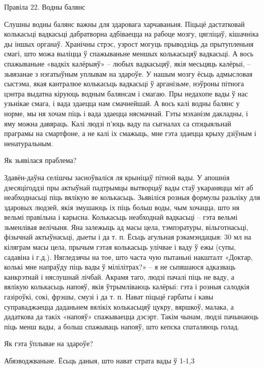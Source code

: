 Правіла 22. Водны балянс

Слушны водны балянс важны для здаровага харчаваньня. Піцьцё дастатковай колькасьці вадкасьці дабратворна адбіваецца на рабоце мозгу, цягліцаў, кішачніка ды іншых органаў. Хранічны стрэс, узрост могуць прыводзіць да прытупленьня смагі, што можа выліцца ў спажываньне меншых колькасьцяў вадкасьці. А вось спажываньне «вадкіх калёрыяў» – любых вадкасьцяў, якія месьцяць калёрыі, – зьвязанае з нэгатыўным уплывам на здароўе.
У нашым мозгу ёсьць адмысловая сыстэма, якая кантралюе колькасьць вадкасьці ў арганізьме, нэўроны пітнога цэнтра выдатна кіруюць водным балянсам і смагаю. Пры недахопе вады ў нас узьнікае смага, і вада здаецца нам смачнейшай. А вось калі водны балянс у норме, мы ня хочам піць і вада здаецца нясмачнай. Гэты мэханізм дакладны, і яму можна давяраць. Калі людзі п'юць ваду па сыгналах са спэцыяльнай праграмы на смартфоне, а не калі іх смажыць, мне гэта здаецца крыху дзіўным і ненатуральным.

Як зьявілася праблема?

Здавён-даўна селішчы засноўваліся ля крыніцаў пітной вады. У апошнія дзесяцігоддзі пры актыўнай падтрымцы вытворцаў вады стаў укараняцца міт аб неабходнасьці піць вялікую яе колькасьць. Зьявіліся розныя формулы разьліку для здаровых людзей, якія змушаюць іх піць больш воды, чым хочацца, што ня вельмі правільна і карысна. Колькасьць неабходнай вадкасьці – гэта вельмі зьменлівая велічыня. Яна залежыць ад масы цела, тэмпэратуры, вільготнасьці, фізычнай актыўнасьці, дыеты і да т. п. Ёсьць агульная рэкамэндацыя: 30 мл на кіляграм масы цела, прычым гэтая колькасьць улічвае і ваду ў ежы (супы, садавіна і г.д.). Нягледзячы на тое, што часта чую пытаньні накшталт «Доктар, колькі мне напраўду піць вады ў мілілітрах?» – я не сьпяшаюся адказваць канкрэтнай і няслушнай лічбай.
Акрамя таго, людзі пачалі піць не ваду, а вялікую колькасьць напояў, якія ўтрымліваюць калёрыі: гэта і розныя салодкія газіроўкі, сокі, фрэшы, смузі і да т. п. Нават піцьцё гарбаты і кавы суправаджаецца даданьнем вялікіх колькасьцяў цукру, вяршкоў, малака, а дадаткова да такіх «напояў» спажываецца дэсэрт. Такім чынам, людзі пачынаюць піць менш вады, а больш спажываць напояў, што кепска спаталяюць голад.

Як гэта ўплывае на здароўе?

Абязводжваньне.
Ёсьць даныя, што нават страта вады ў 1-1,3%

